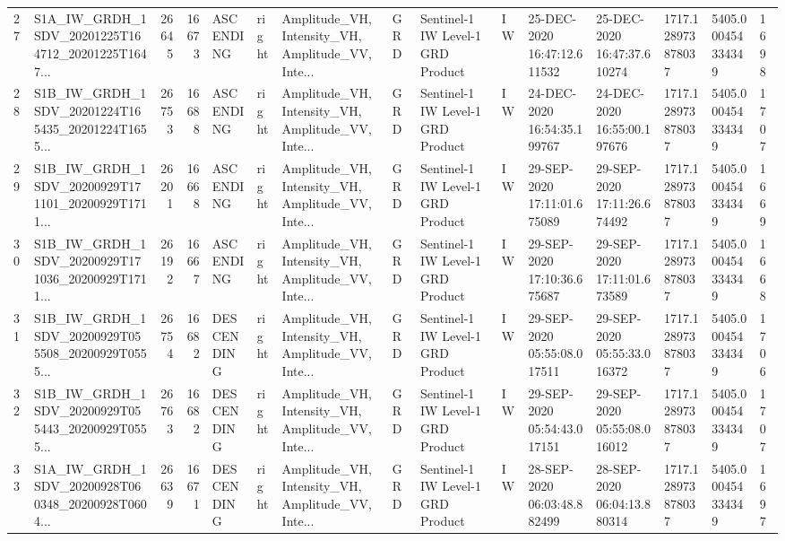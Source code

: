 \begin{tabular}{llrrlllllllllll}
27  &  S1A\_IW\_GRDH\_1SDV\_20201225T164712\_20201225T1647... &  26645 &   16673 &   ASCENDING &  right &  Amplitude\_VH, Intensity\_VH, Amplitude\_VV, Inte... &          GRD &  Sentinel-1 IW Level-1 GRD Product &              IW &  25-DEC-2020 16:47:12.611532 &  25-DEC-2020 16:47:37.610274 &          1717.128973878037 &  5405.000454334349 &       1698 \\
28  &  S1B\_IW\_GRDH\_1SDV\_20201224T165435\_20201224T1655... &  26753 &   16688 &   ASCENDING &  right &  Amplitude\_VH, Intensity\_VH, Amplitude\_VV, Inte... &          GRD &  Sentinel-1 IW Level-1 GRD Product &              IW &  24-DEC-2020 16:54:35.199767 &  24-DEC-2020 16:55:00.197676 &          1717.128973878037 &  5405.000454334349 &       1707 \\
29  &  S1B\_IW\_GRDH\_1SDV\_20200929T171101\_20200929T1711... &  26201 &   16668 &   ASCENDING &  right &  Amplitude\_VH, Intensity\_VH, Amplitude\_VV, Inte... &          GRD &  Sentinel-1 IW Level-1 GRD Product &              IW &  29-SEP-2020 17:11:01.675089 &  29-SEP-2020 17:11:26.674492 &          1717.128973878037 &  5405.000454334349 &       1669 \\
30  &  S1B\_IW\_GRDH\_1SDV\_20200929T171036\_20200929T1711... &  26192 &   16667 &   ASCENDING &  right &  Amplitude\_VH, Intensity\_VH, Amplitude\_VV, Inte... &          GRD &  Sentinel-1 IW Level-1 GRD Product &              IW &  29-SEP-2020 17:10:36.675687 &  29-SEP-2020 17:11:01.673589 &          1717.128973878037 &  5405.000454334349 &       1668 \\
31  &  S1B\_IW\_GRDH\_1SDV\_20200929T055508\_20200929T0555... &  26754 &   16682 &  DESCENDING &  right &  Amplitude\_VH, Intensity\_VH, Amplitude\_VV, Inte... &          GRD &  Sentinel-1 IW Level-1 GRD Product &              IW &  29-SEP-2020 05:55:08.017511 &  29-SEP-2020 05:55:33.016372 &          1717.128973878037 &  5405.000454334349 &       1706 \\
32  &  S1B\_IW\_GRDH\_1SDV\_20200929T055443\_20200929T0555... &  26763 &   16682 &  DESCENDING &  right &  Amplitude\_VH, Intensity\_VH, Amplitude\_VV, Inte... &          GRD &  Sentinel-1 IW Level-1 GRD Product &              IW &  29-SEP-2020 05:54:43.017151 &  29-SEP-2020 05:55:08.016012 &          1717.128973878037 &  5405.000454334349 &       1707 \\
33  &  S1A\_IW\_GRDH\_1SDV\_20200928T060348\_20200928T0604... &  26639 &   16671 &  DESCENDING &  right &  Amplitude\_VH, Intensity\_VH, Amplitude\_VV, Inte... &          GRD &  Sentinel-1 IW Level-1 GRD Product &              IW &  28-SEP-2020 06:03:48.882499 &  28-SEP-2020 06:04:13.880314 &          1717.128973878037 &  5405.000454334349 &       1697 \\

\end{tabular}
